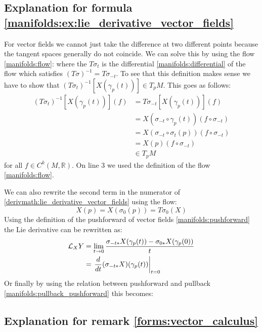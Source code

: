 \subsection{Explanation for formula \ref{manifolds:ex:lie_derivative_vector_fields}}

 For vector fields we cannot just take the difference at two different points because the tangent spaces generally do not coincide. We can solve this by using the flow \ref{manifolds:flow}:
		where the $T\sigma_t$ is the differential \ref{manifolds:differential} of the flow which satisfies $(T\sigma)^{-1} = T\sigma_{-t}$. To see that this definition makes sense we have to show that $(T\sigma_t)^{-1}[X(\gamma_p(t))]\in T_pM$. This goes as follows:
		\begin{align*}
			(T\sigma_t)^{-1}[X(\gamma_p(t))](f) &= T\sigma_{-t}[X(\gamma_p(t))](f)\\
			&= X(\sigma_{-t}\circ\gamma_p(t))(f\circ\sigma_{-t})\\
			&= X(\sigma_{-t}\circ\sigma_t(p))(f\circ\sigma_{-t})\\
			&= X(p)(f\circ\sigma_{-t})\\
			&\in T_pM
		\end{align*}
		for all $f\in C^k(M, \mathbb{R})$. On line 3 we used the definition of the flow \ref{manifolds:flow}.
		
		We can also rewrite the second term in the numerator of \ref{derivmath:lie_derivative_vector_fields} using the flow:
		\[
			X(p) = X(\sigma_0(p)) = T\sigma_0(X)
		\]
		Using the definition of the pushforward of vector fields \ref{manifolds:pushforward} the Lie derivative can be rewritten as:
		\begin{align*}
			\mathcal{L}_XY &= \lim_{t\rightarrow0}\stylefrac{\sigma_{-t*}X(\gamma_p(t)) - \sigma_{0*}X(\gamma_p(0))}{t}\\
			&= \left.\deriv{}{t}(\sigma_{-t*}X)(\gamma_p(t))\right|_{t=0}
		\end{align*}
		Or finally by using the relation between pushforward and pullback \ref{manifolds:pullback_pushforward} this becomes:
		 
\subsection{Explanation for remark \ref{forms:vector_calculus}}

